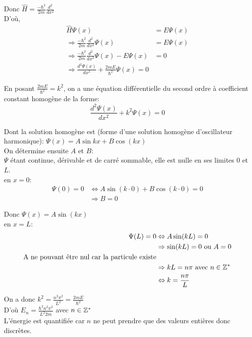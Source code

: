 \documentclass[../main.tex]{subfile}
\begin{document}
Donc $\hat{H} = \frac{-\hbar^2}{2m} \frac{d^2}{d x^2}$\\
D'où, 
$$
\begin{aligned}
      \hat{H} \Psi(x) &= E \Psi(x)\\
      \Rightarrow \frac{-\hbar^2}{2m} \frac{d^2}{d x^2} \Psi(x) &= E \Psi(x)\\
      \Rightarrow \frac{-\hbar^2}{2m} \frac{d^2}{d x^2} \Psi(x) - E \Psi(x) &= 0\\
      \Rightarrow \frac{d^2 \Psi(x)}{d x^2} + \frac{2mE}{\hbar^2} \Psi(x) = 0
\end{aligned}
$$

En posant $\frac{2mE}{\hbar^2} = k^2$, on a une équation différentielle du second ordre à coefficient constant homogène de la forme:
      $$\frac{d^2 \Psi(x)}{d x^2} + k^2 \Psi(x) = 0$$

      Dont la solution homogène est (forme d'une solution homogène d'oscillateur harmonique):
      $\Psi(x) = A\sin{kx} + B\cos(kx)$\\

      On détermine ensuite $A$ et $B$:\\
      $\Psi$ étant continue, dérivable et de carré sommable, elle est nulle en ses limites $0$ et $L$.\\
      en $x=0$:
      $$
     \begin{aligned} 
        \Psi(0) = 0 &\Leftrightarrow A \sin(k \cdot 0) + B \cos(k \cdot 0) = 0\\
        &\Rightarrow B = 0
     \end{aligned}
      $$

      Donc $\Psi(x) = A\sin(kx)$\\
      en $x=L$:
      $$
\begin{aligned}
   \Psi(L) = 0 &\Leftrightarrow A\sin(kL) = 0\\
   &\Rightarrow \sin(kL) = 0 \text{ ou } A = 0\\
   \text{A ne pouvant être nul car la particule existe}\\
   &\Rightarrow kL = n\pi \text{ avec } n \in \mathbb{Z}^*\\
   &\Leftrightarrow k = \frac{n\pi}{L}\\
\end{aligned}
      $$

      On a donc $k^2 = \frac{n^2\pi^2}{L^2} = \frac{2mE}{\hbar^2}$\\

      D'où $E_n = \frac{\hbar^2 n^2 \pi^2}{L^2 2m}$ avec $n \in \mathbb{Z}^*$\\
      L'énergie est quantifiée car $n$ ne peut prendre que des valeurs entières donc discrètes.\\
\end{document}
